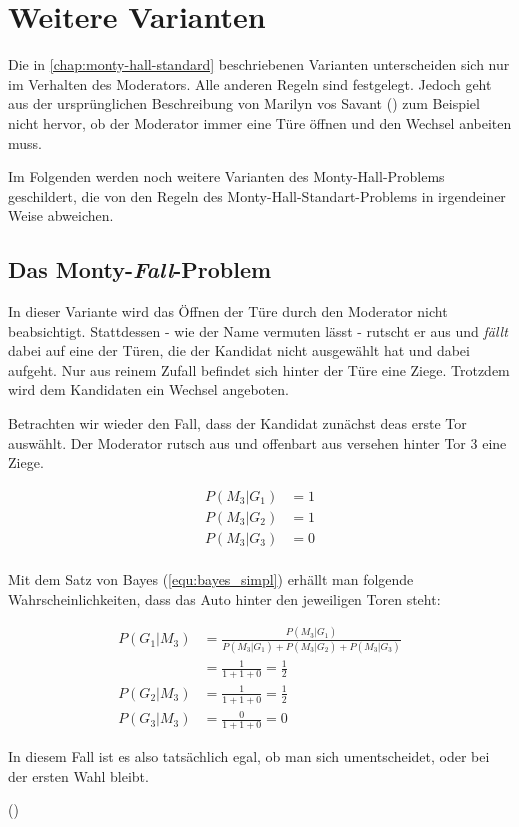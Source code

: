 \chapter{Weitere Varianten}

Die in \autoref{chap:monty-hall-standard} beschriebenen Varianten unterscheiden sich nur im Verhalten des Moderators. Alle anderen Regeln sind festgelegt.
Jedoch geht aus der ursprünglichen Beschreibung von Marilyn vos Savant (\cite{Savant:1990}) zum Beispiel nicht hervor, ob der Moderator immer eine Türe öffnen und den Wechsel anbeiten muss.

Im Folgenden werden noch weitere Varianten des Monty-Hall-Problems geschildert, die von den Regeln des Monty-Hall-Standart-Problems in irgendeiner Weise abweichen.

\section{Das Monty-\textit{Fall}-Problem}

In dieser Variante wird das Öffnen der Türe durch den Moderator nicht beabsichtigt. Stattdessen - wie der Name vermuten lässt - rutscht er aus und \textit{fällt} dabei auf eine der Türen, die der Kandidat nicht ausgewählt hat und dabei aufgeht. Nur aus reinem Zufall befindet sich hinter der Türe eine Ziege. Trotzdem wird dem Kandidaten ein Wechsel angeboten.

Betrachten wir wieder den Fall, dass der Kandidat zunächst deas erste Tor auswählt. Der Moderator rutsch aus und offenbart aus versehen hinter Tor 3 eine Ziege.

\begin{equation*}
    \begin{split}
        P(M_3|G_1) &= 1 \\
        P(M_3|G_2) &= 1 \\
        P(M_3|G_3) &= 0 \\
    \end{split}
\end{equation*}

Mit dem Satz von Bayes (\autoref{equ:bayes_simpl}) erhällt man folgende Wahrscheinlichkeiten, dass das Auto hinter den jeweiligen Toren steht:

\begin{equation}
    \begin{split}
        P(G_1|M_3) & = \frac{P(M_3|G_1)}{P(M_3|G_1) + P(M_3|G_2) + P(M_3|G_3)} \\
        & = \frac{1}{1+1+0} = \frac{1}{2} \\
        P(G_2|M_3) & = \frac{1}{1+1+0} = \frac{1}{2} \\
        P(G_3|M_3) & = \frac{0}{1+1+0} = 0
    \end{split}
\end{equation}

In diesem Fall ist es also tatsächlich egal, ob man sich umentscheidet, oder bei der ersten Wahl bleibt.

(\cite{Rosenthal:2008})